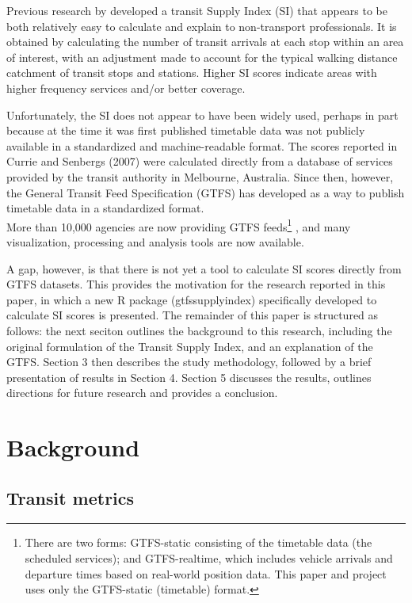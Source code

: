 \documentclass[preprint, 3p,
authoryear]{elsarticle} %
\begin{document}
Previous research by \citet{currie2007identifying} developed a transit
Supply Index (SI) that appears to be both relatively easy to calculate
and explain to non-transport professionals. It is obtained by
calculating the number of transit arrivals at each stop within an area
of interest, with an adjustment made to account for the typical walking
distance catchment of transit stops and stations. Higher SI scores
indicate areas with higher frequency services and/or better coverage.

Unfortunately, the SI does not appear to have been widely used, perhaps
in part because at the time it was first published timetable data was
not publicly available in a standardized and machine-readable format.
The scores reported in Currie and Senbergs (2007) were calculated
directly from a database of services provided by the transit authority
in Melbourne, Australia. Since then, however, the General Transit Feed
Specification (GTFS) has developed as a way to publish timetable data in
a standardized format.\\
More than 10,000 agencies are now providing GTFS feeds\footnote{There
  are two forms: GTFS-static consisting of the timetable data (the
  scheduled services); and GTFS-realtime, which includes vehicle
  arrivals and departure times based on real-world position data. This
  paper and project uses only the GTFS-static (timetable) format.}
\citep{GTFS}, and many visualization, processing and analysis tools are
now available.

A gap, however, is that there is not yet a tool to calculate SI scores
directly from GTFS datasets. This provides the motivation for the
research reported in this paper, in which a new R package
(gtfssupplyindex) specifically developed to calculate SI scores is
presented. The remainder of this paper is structured as follows: the
next seciton outlines the background to this research, including the
original formulation of the Transit Supply Index, and an explanation of
the GTFS. Section 3 then describes the study methodology, followed by a
brief presentation of results in Section 4. Section 5 discusses the
results, outlines directions for future research and provides a
conclusion.

\hypertarget{background}{%
\section{Background}\label{background}}

\hypertarget{transit-metrics}{%
\subsection{Transit metrics}\label{transit-metrics}}
\end{document}
